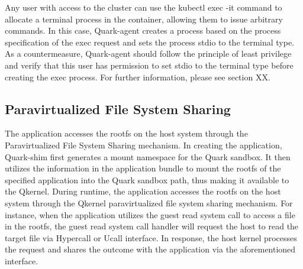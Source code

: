 
Any user with access to the cluster can use the kubectl exec -it command to allocate a terminal process in the container, allowing them to issue arbitrary commands. In this case, Quark-agent creates a process based on the process specification 
of the exec request and sets the process stdio to the terminal type. As a countermeasure, Quark-agent should follow the principle of least privilege and verify that this user has permission to set stdio to the terminal type before creating 
the exec process. For further information, please see section XX.

\subsection{Paravirtualized File System Sharing}

The application accesses the rootfs on the host system through the Paravirtualized File System Sharing mechanism. In creating the application, Quark-shim first generates a mount namespace for the Quark sandbox. It then utilizes the information 
in the application bundle to mount the rootfs of the specified application into the Quark sandbox path, thus making it available to the Qkernel. During runtime, the application accesses the rootfs on the host system through the Qkernel 
paravirtualized file system sharing mechanism. For instance, when the application utilizes the guest read system call to access a file in the rootfs,  the guest read system call handler will request the host to read the target file via Hypercall 
or Ucall interface. In response, the host kernel processes the request and shares the outcome with the application via the aforementioned interface.


